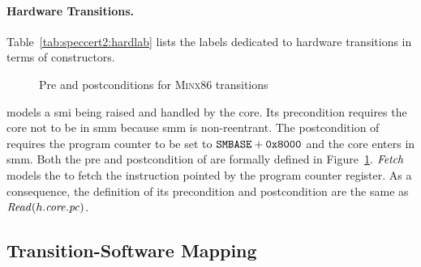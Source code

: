 \paragraph{Hardware Transitions.}
Table~\ref{tab:speccert2:hardlab} lists the labels dedicated to hardware
transitions in terms of constructors.

\begin{figure}
  \centering
  \begin{prooftree}
  \end{prooftree}

  \caption{Pre and postconditions for {\scshape Minx86} 
    transitions}
  \label{fig:speccert2:receiveSMI}
\end{figure}

 models a \ac{smi} being raised and handled by the core.
%
Its precondition requires the core not to be in \ac{smm} because \ac{smm} is
non-reentrant.
%
The postcondition of  requires the program counter to be set to
$\texttt{SMBASE} + \val{0x8000}$ and the core enters in \ac{smm}.
%
Both the pre and postcondition of  are formally defined in
Figure~\ref{fig:speccert2:receiveSMI}.
%
$\func{Fetch}$ models the \IO to fetch the instruction pointed by the program
counter register.
%
As a consequence, the definition of its precondition and postcondition are the
same as \( \func{Read}(h.\func{core}.\func{pc}) \).
%

\subsection{Transition-Software Mapping}
\label{subsec:minx86:fetched}

